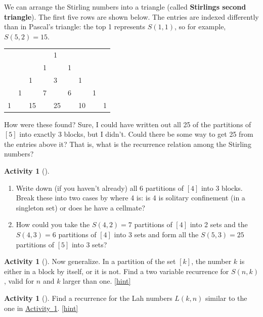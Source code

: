 \documentclass[10pt,]{book}
\newcommand{\terminology}[1]{\textbf{#1}}
\theoremstyle{plain}
\theoremstyle{definition}
\theoremstyle{definition}
\theoremstyle{definition}
\newtheorem{activity}[project]{Activity}
\numberwithin{equation}{chapter}
\begin{document}
\hypertarget{p-1084}{}%
We can arrange the Stirling numbers into a triangle (called \terminology{Stirlings second triangle}).  The first five rows are shown below.  The entries are indexed differently than in Pascal's triangle: the top 1 represents \(S(1,1)\), so for example, \(S(5,2) = 15\).%
\begin{sidebyside}{1}{0.25}{0.25}{0}
\begin{sbspanel}{0.5}
{\centering%
\begin{tabular}{lllllllll}
&&&&1&&&&\tabularnewline[0pt]
&&&1&&1&&&\tabularnewline[0pt]
&&1&&3&&1&&\tabularnewline[0pt]
&1&&7&&6&&1&\tabularnewline[0pt]
1&&15&&25&&10&&1
\end{tabular}
\par}
\end{sbspanel}
\end{sidebyside}
\par
\hypertarget{p-1085}{}%
How were these found?  Sure, I could have written out all 25 of the partitions of \([5]\) into exactly \(3\) blocks, but I didn't.  Could there be some way to get 25 from the entries above it?  That is, what is the recurrence relation among the Stirling numbers?%
\begin{activity}[]\label{activity-192}
\leavevmode%
\begin{enumerate}[font=\bfseries,label=(\alph*),ref=\alph*]
\item\label{task-211} \hypertarget{p-1086}{}%
Write down (if you haven't already) all 6 partitions of \([4]\) into \(3\) blocks.  Break these into two cases by where 4 is: is 4 is solitary confinement (in a singleton set) or does he have a cellmate?%
\item\label{task-212} \hypertarget{p-1087}{}%
How could you take the \(S(4,2) = 7\) partitions of \([4]\) into 2 sets and the \(S(4,3) = 6\) partitions of \([4]\) into 3 sets and form all the \(S(5,3) = 25\) partitions of \([5]\) into \(3\) sets?%
\end{enumerate}
\end{activity}
\begin{activity}[]\label{secondstirlingrecurrence}
\hypertarget{p-1088}{}%
Now generalize.  In a partition of the set \([k]\), the number \(k\) is either in a block by itself, or it is not.  Find a two variable recurrence for \(S(n,k)\), valid for \(n\) and \(k\) larger than one.%
\hfill{\tiny\hyperlink{a-200}{[hint]}\hypertarget{q-200}{}}\end{activity}
\begin{activity}[]\label{activity-194}
\hypertarget{p-1091}{}%
Find a recurrence for the Lah numbers \(L(k,n)\) similar to the one in \hyperref[secondstirlingrecurrence]{Activity~\ref{secondstirlingrecurrence}}.%
\hfill{\tiny\hyperlink{a-201}{[hint]}\hypertarget{q-201}{}}\end{activity}
\end{document}
